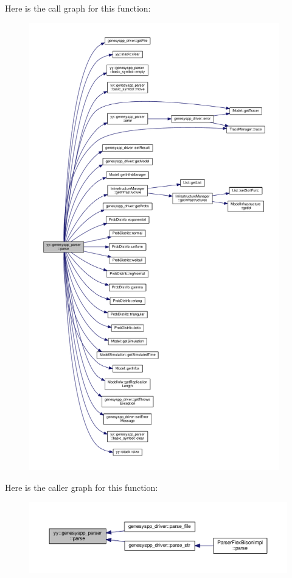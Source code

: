 Here is the call graph for this function\-:
\nopagebreak
\begin{figure}[H]
\begin{center}
\leavevmode
\includegraphics[height=550pt]{classyy_1_1genesyspp__parser_ab2fad51435ec4f28dfee2d5e4611f309_cgraph}
\end{center}
\end{figure}




Here is the caller graph for this function\-:
\nopagebreak
\begin{figure}[H]
\begin{center}
\leavevmode
\includegraphics[width=350pt]{classyy_1_1genesyspp__parser_ab2fad51435ec4f28dfee2d5e4611f309_icgraph}
\end{center}
\end{figure}


